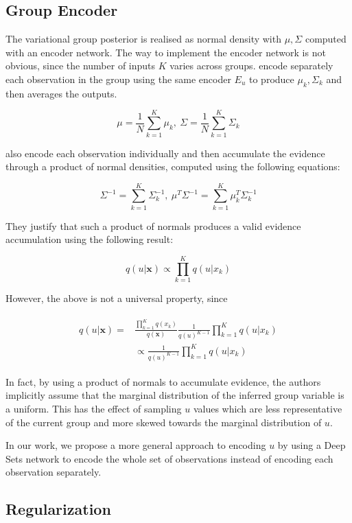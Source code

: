 \documentclass[nohyperref]{article}
\theoremstyle{plain}
\theoremstyle{definition}
\theoremstyle{remark}
\begin{document}
\subsection{Group Encoder}

The variational group posterior is realised as normal density with $\mu, \Sigma$ computed with an encoder network. The way to implement the encoder network is not obvious, since the number of inputs $K$ varies across groups. \citet{Hosoya2019GroupbasedLO} encode separately each observation in the group using the same encoder $E_u$ to produce $\mu_k, \Sigma_k$ and then averages the outputs.

$$\mu = \frac{1}{N} \sum_{k=1}^K \mu_k, ~ \Sigma = \frac{1}{N} \sum_{k=1}^K \Sigma_k$$

\citet{Bouchacourt2018MultiLevelVA} also encode each observation individually and then accumulate the evidence through a product of normal densities, computed using the following equations:

$$\Sigma^{-1} = \sum_{k=1}^K \Sigma_k^{-1}, ~ \mu^T \Sigma^{-1} = \sum_{k=1}^K \mu_k^T \Sigma_k^{-1}$$

They justify that such a product of normals produces a valid evidence accumulation using the following result:

$$q(u | \mathbf{x}) \propto \prod_{k=1}^K q(u | x_k)$$

However, the above is not a universal property, since

\begin{align}
    \begin{split}
        q(u | \mathbf{x}) = &\frac{\prod_{k=1}^K q(x_k)}{q(\mathbf{x})} \frac{1}{q(u)^{K-1}} \prod_{k=1}^K q(u | x_k) \\ &\propto \frac{1}{q(u)^{K-1}} \prod_{k=1}^K q(u | x_k)
    \end{split}
\end{align}

In fact, by using a product of normals to accumulate evidence, the authors implicitly assume that the marginal distribution of the inferred group variable is a uniform. This has the effect of sampling $u$ values which are less representative of the current group and more skewed towards the marginal distribution of $u$.

In our work, we propose a more general approach to encoding $u$ by using a Deep Sets  network \citep{Zaheer2017DeepS} to encode the whole set of observations instead of encoding each observation separately.

\subsection{Regularization}
\end{document}
